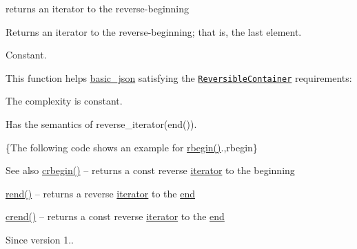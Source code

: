 returns an iterator to the reverse-\/beginning 

Returns an iterator to the reverse-\/beginning; that is, the last element.

  Constant.

This function helps {\ttfamily \hyperlink{classnlohmann_1_1basic__json}{basic\+\_\+json}} satisfying the \href{http://en.cppreference.com/w/cpp/concept/ReversibleContainer}{\tt Reversible\+Container} requirements\+:
\begin{DoxyItemize}
\item The complexity is constant.
\item Has the semantics of {\ttfamily reverse\+\_\+iterator(end())}.
\end{DoxyItemize}

\{The following code shows an example for {\ttfamily \hyperlink{classnlohmann_1_1basic__json_a62ccf5b9b3674aec2403fbc02da03db8}{rbegin()}}.,rbegin\}

\begin{DoxySeeAlso}{See also}
\hyperlink{classnlohmann_1_1basic__json_a060b33f8f255986088652625f9d50681}{crbegin()} -- returns a const reverse \hyperlink{classnlohmann_1_1basic__json_1_1iterator}{iterator} to the beginning 

\hyperlink{classnlohmann_1_1basic__json_aaa160a960dd3dd90856a72b1d8dbe707}{rend()} -- returns a reverse \hyperlink{classnlohmann_1_1basic__json_1_1iterator}{iterator} to the \hyperlink{classnlohmann_1_1basic__json_a12ccf14d39ddae52f6c7e126105a230b}{end} 

\hyperlink{classnlohmann_1_1basic__json_aa7084e62b93ef0236698b246a58bb2da}{crend()} -- returns a const reverse \hyperlink{classnlohmann_1_1basic__json_1_1iterator}{iterator} to the \hyperlink{classnlohmann_1_1basic__json_a12ccf14d39ddae52f6c7e126105a230b}{end}
\end{DoxySeeAlso}
\begin{DoxySince}{Since}
version 1.. 
\end{DoxySince}
\hypertarget{classnlohmann_1_1basic__json_a15e70a44e2a8db929694819fed256653}{}\label{classnlohmann_1_1basic__json_a15e70a44e2a8db929694819fed256653} 
